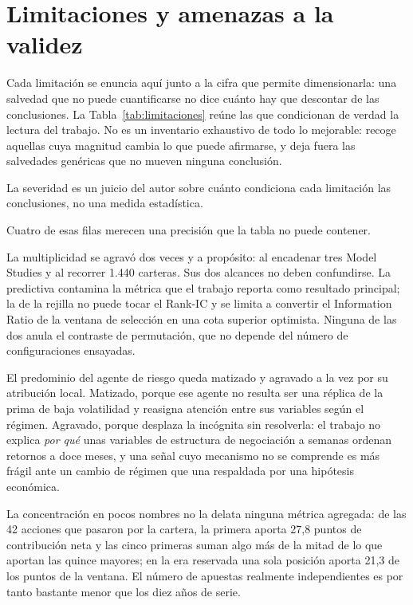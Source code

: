 \chapter{Limitaciones y amenazas a la validez}
\label{chap:limitaciones}

Cada limitación se enuncia aquí junto a la cifra que permite dimensionarla: una salvedad que no
puede cuantificarse no dice cuánto hay que descontar de las conclusiones. La
Tabla~\ref{tab:limitaciones} reúne las que condicionan de verdad la lectura del trabajo. No es un
inventario exhaustivo de todo lo mejorable: recoge aquellas cuya magnitud cambia lo que puede
afirmarse, y deja fuera las salvedades genéricas que no mueven ninguna conclusión.

{\footnotesize

}

\noindent\footnotesize{La severidad es un juicio del autor sobre cuánto condiciona cada limitación
las conclusiones, no una medida estadística.}\normalsize

Cuatro de esas filas merecen una precisión que la tabla no puede contener.

La multiplicidad se agravó dos veces y a propósito: al encadenar tres Model Studies y al
recorrer 1.440 carteras. Sus dos alcances no deben confundirse. La predictiva contamina la métrica
que el trabajo reporta como resultado principal; la de la rejilla no puede tocar el Rank-IC y se
limita a convertir el Information Ratio de la ventana de selección en una cota superior optimista.
Ninguna de las dos anula el contraste de permutación, que no depende del número de configuraciones
ensayadas.

El predominio del agente de riesgo queda matizado y agravado a la vez por su atribución
local. Matizado, porque ese agente no resulta ser una réplica de la prima de baja volatilidad y
reasigna atención entre sus variables según el régimen. Agravado, porque desplaza la incógnita sin
resolverla: el trabajo no explica \emph{por qué} unas variables de estructura de negociación a
semanas ordenan retornos a doce meses, y una señal cuyo mecanismo no se comprende es más frágil ante
un cambio de régimen que una respaldada por una hipótesis económica.

La concentración en pocos nombres no la delata ninguna métrica agregada: de las 42 acciones
que pasaron por la cartera, la primera aporta 27,8 puntos de contribución neta y las cinco primeras
suman algo más de la mitad de lo que aportan las quince mayores; en la era reservada una sola
posición aporta 21,3 de los puntos de la ventana. El número de apuestas realmente independientes es
por tanto bastante menor que los diez años de serie.

